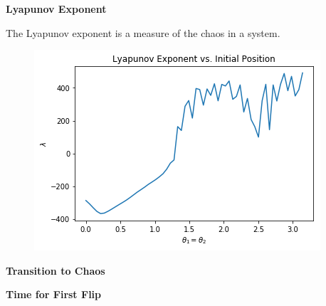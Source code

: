 \begin{problem}{2}
\textbf{Lyapunov Exponent}

The Lyapunov exponent is a measure of the chaos in a system.  

\begin{figure}[ht!]
	\centering
	\includegraphics[scale=0.6]{../figures/lyapunov.png}
	\caption{}
	\label{lyapunov}
\end{figure}

\end{problem}

\begin{problem}{3}
\textbf{Transition to Chaos}

\begin{figure}[ht!]
	\centering
	\caption{}
	\label{}
\end{figure}

\end{problem}

\begin{problem}{4}
\textbf{Time for First Flip}

\begin{figure}[ht!]
	\centering
	\caption{}
	\label{}
\end{figure}

\end{problem}
